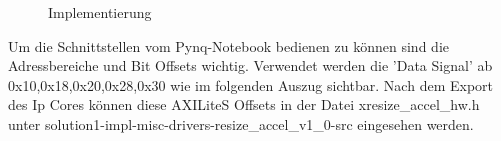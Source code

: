 \documentclass[a4paper]{report}
\begin{document}
\begin{figure}[H]
\centering
{}
\caption{Implementierung}
\label{fig:Implementierung}
\end{figure}

Um die Schnittstellen vom Pynq-Notebook bedienen zu können sind die Adressbereiche und Bit Offsets wichtig. Verwendet werden die 'Data Signal' ab 0x10,0x18,0x20,0x28,0x30 wie im folgenden Auszug sichtbar. Nach dem Export des Ip Cores können diese AXILiteS Offsets in der Datei xresize\_accel\_hw.h unter solution1-impl-misc-drivers-resize\_accel\_v1\_0-src eingesehen werden.
\end{document}
